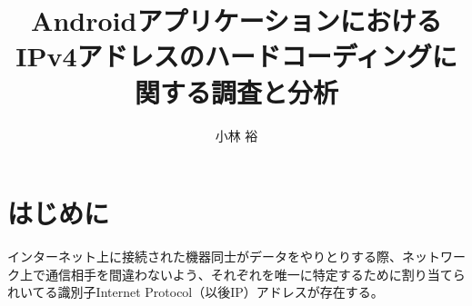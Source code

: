 \documentclass[a4j]{jarticle}
\date{}
\begin{document}

\makeatletter %
	\def\@thesis{令和3年度 東邦大学理学部情報科学科 卒業研究}
	\def\id#1{\def\@id{#1}}
	\def\department#1{\def\@department{#1}}
	
	\def\@maketitle{
		\begin{center}
			\vspace{10mm}
			{\large \@thesis \par}	%
			\vspace{50mm}
			{\huge\bf \@title \par}	%
			\vspace{15mm}
			{\Large 学籍番号　\@id \par}	%
			\vspace{5mm}
			{\Large \@author \par}	%
			\vspace{50mm}
		\end{center}
		\begin{flushright}
			{\large 金岡研究室}
		\end{flushright}
	}
\makeatother

\title{AndroidアプリケーションにおけるIPv4アドレスのハードコーディングに関する調査と分析} %
\id{5517044} %
\author{小林 裕} %
\maketitle{\title} %
\thispagestyle{empty} %
\newpage %

\tableofcontents %





\newpage
\section{はじめに} 
インターネット上に接続された機器同士がデータをやりとりする際、ネットワーク上で通信相手を間違わないよう、それぞれを唯一に特定するために割り当てられいてる識別子Internet Protocol（以後IP）アドレスが存在する。
\end{document}

